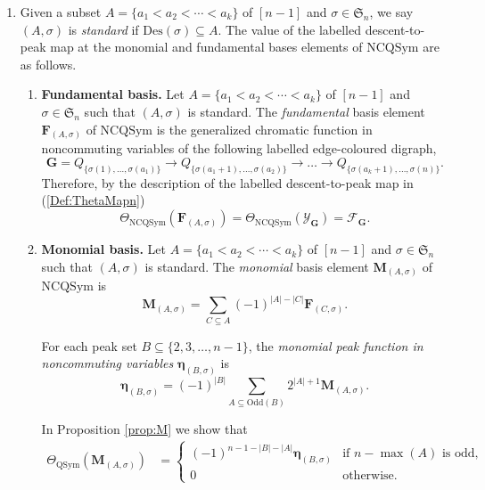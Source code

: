 \documentclass[11pt]{amsart}
\numberwithin{equation}{section}
\newcommand{\NCQSym}{\mathrm{NCQSym}}
\newcommand{\QSym}{\mathrm{QSym}}
\newcommand{\odd}{\mathrm{Odd}}
\newcommand{\Des}{\mathrm{Des}}
\newcommand{\bM}{\mathbf{M}}
\newcommand{\bF}{\mathbf{F}}
\newcommand{\scrY}{{\mathscr{Y}}}
\newcommand{\scrF}{{\mathscr{F}}}
\newcommand{\bfM}{{\mathbf{M}}}
\newcommand{\bfG}{{\mathbf{G}}}
\newcommand{\boldeta}{{\boldsymbol{\eta}}}
\begin{document}
\begin{enumerate}[leftmargin=*]
\begin{center}
\end{center}

 

 

\item Given a subset $A=\{a_1<a_2<\cdots<a_{k}\}$ of $[n-1]$
 and $\sigma\in\mathfrak{S}_n$, we say $(A,\sigma)$ is \emph{standard} if $\Des(\sigma)\subseteq A.$ The value of the labelled descent-to-peak map at the monomial and fundamental bases elements of $\NCQSym$ are as follows. 
 \begin{enumerate} 
\item   
{\bf Fundamental basis.} 
Let $A=\{a_1<a_2<\cdots<a_{k}\}$ of $[n-1]$
 and $\sigma\in\mathfrak{S}_n$ such that $(A,\sigma)$ is standard. The \emph{fundamental} basis element $\bF_{(A,\sigma)}$ of $\NCQSym$ is the generalized chromatic function in noncommuting variables of the following labelled edge-coloured digraph,
 $$\bfG=Q_{\{\sigma(1),\dots,\sigma(a_1)\}}\rightarrow Q_{\{\sigma(a_1+1), \dots, \sigma(a_2)\}}\rightarrow \dots \rightarrow Q_{\{\sigma(a_k+1),\dots,\sigma(n)\}}.$$
 Therefore, by the description of the labelled descent-to-peak map in (\ref{Def:ThetaMapn})
 $$\Theta_{\NCQSym}(\bF_{(A,\sigma)})=\Theta_{\NCQSym}(\scrY_{\bfG})=\scrF_\bfG.$$
 
\item {\bf Monomial basis.} Let $A=\{a_1<a_2<\cdots<a_{k}\}$ of $[n-1]$
 and $\sigma\in\mathfrak{S}_n$ such that $(A,\sigma)$ is standard. The \emph{monomial} basis element $\bM_{(A,\sigma)}$ of $\NCQSym$ is
$$\bM_{(A,\sigma)}=\sum_{C\subseteq A} (-1)^{|A|-|C|} \bF_{(C,\sigma)}.$$

For each peak set $B\subseteq \{2,3,\dots, n-1\}$, the \emph{monomial peak function in noncommuting variables} $\boldeta_{(B,\sigma)}$ is 
$$\boldeta_{(B,\sigma)}=(-1)^{|B|}\sum_{A\subseteq \odd(B)} 2^{|A|+1}\bM_{(A,\sigma)}.$$

In Proposition \ref{prop:M} we show that 
\begin{align*}
\Theta_{\QSym}(\bM_{(A,\sigma)})
&=\begin{cases}
(-1)^{n-1-|B|-|A|} \boldeta_{(B,\sigma)} & \text{if $n-\max(A)$ is odd,}\\
0 & \text{otherwise.}
\end{cases} 
\end{align*}


\end{enumerate}
\end{enumerate}
\end{document}
